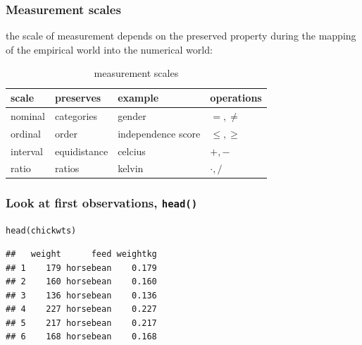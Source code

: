 \documentclass[extsize,handout,10pt]{beamer}\usepackage[]{graphicx}\usepackage[]{color}
\makeatletter
\newcommand{\hlnum}[1]{\textcolor[rgb]{0.502,0.086,1}{#1}}%
\newcommand{\hlcom}[1]{\textcolor[rgb]{1,0.251,0.502}{#1}}%
\newcommand{\hlopt}[1]{\textcolor[rgb]{0.251,0.251,0.251}{#1}}%
\newcommand{\hlstd}[1]{\textcolor[rgb]{0.251,0.251,0.251}{#1}}%
\newcommand{\hlkwb}[1]{\textcolor[rgb]{0,0.439,0.902}{#1}}%
\newcommand{\hlkwd}[1]{\textcolor[rgb]{0.69,0.188,0.941}{#1}}%
\newenvironment{kframe}{%
 \def\at@end@of@kframe{}%
 \ifinner\ifhmode%
  \def\at@end@of@kframe{\end{minipage}}%
  \begin{minipage}{\columnwidth}%
 \fi\fi%
 \def\FrameCommand##1{\hskip\@totalleftmargin \hskip-\fboxsep
 \colorbox{shadecolor}{##1}\hskip-\fboxsep
     \hskip-\linewidth \hskip-\@totalleftmargin \hskip\columnwidth}%
 \MakeFramed {\advance\hsize-\width
   \@totalleftmargin\z@ \linewidth\hsize
   \@setminipage}}%
 {\par\unskip\endMakeFramed%
 \at@end@of@kframe}
\newenvironment{knitrout}{}{} %
\makeatother
\begin{document}
\begin{frame}
  \frametitle{Measurement scales}
  the \alert{scale} of measurement depends on the \alert{preserved
    property} during the mapping of the \alert{empirical world} into
  the \alert{numerical world}:
  \begin{table}[h]
    \centering
    \begin{tabular}{llll}
      \alert{scale}&\alert{preserves}&\alert{example}&\alert{operations}\\\hline
      nominal&categories&gender&$=,\neq$\\
      ordinal&order& independence score&$\leq,\geq$\\
      interval&equidistance&celcius&$+,-$\\
      ratio&ratios& kelvin&$\cdot,/$\\
    \end{tabular}
    \caption[measurement scales]{measurement scales}
    \label{tab:Skalenniveaus}
  \end{table}
\end{frame}




\begin{frame}[containsverbatim]
  \frametitle{Look at first observations, \texttt{head()}}
\begin{knitrout}\tiny
{}\color{fgcolor}\begin{kframe}
\begin{alltt}
\hlkwd{head}\hlstd{(chickwts)}
\end{alltt}
\begin{verbatim}
##   weight      feed weightkg
## 1    179 horsebean    0.179
## 2    160 horsebean    0.160
## 3    136 horsebean    0.136
## 4    227 horsebean    0.227
## 5    217 horsebean    0.217
## 6    168 horsebean    0.168
\end{verbatim}
\end{kframe}
\end{knitrout}
\end{frame}
\end{document}
